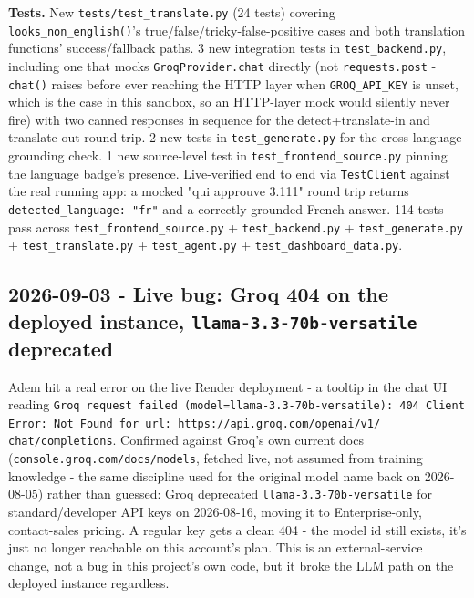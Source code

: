 \textbf{Tests.} New \texttt{tests/\allowbreak{}test\_\allowbreak{}translate.py} (24 tests) covering \texttt{looks\_\allowbreak{}non\_\allowbreak{}english()}'s true/false/tricky-false-positive cases and both translation functions' success/fallback paths. 3 new integration tests in \texttt{test\_\allowbreak{}backend.py}, including one that mocks \texttt{GroqProvider.chat} directly (not \texttt{requests.post} - \texttt{chat()} raises before ever reaching the HTTP layer when \texttt{GROQ\_\allowbreak{}API\_\allowbreak{}KEY} is unset, which is the case in this sandbox, so an HTTP-layer mock would silently never fire) with two canned responses in sequence for the detect+translate-in and translate-out round trip. 2 new tests in \texttt{test\_\allowbreak{}generate.py} for the cross-language grounding check. 1 new source-level test in \texttt{test\_\allowbreak{}frontend\_\allowbreak{}source.py} pinning the language badge's presence. Live-verified end to end via \texttt{TestClient} against the real running app: a mocked "qui approuve 3.111" round trip returns \texttt{detected\_\allowbreak{}language: "fr"} and a correctly-grounded French answer. 114 tests pass across \texttt{test\_\allowbreak{}frontend\_\allowbreak{}source.py} + \texttt{test\_\allowbreak{}backend.py} + \texttt{test\_\allowbreak{}generate.py} + \texttt{test\_\allowbreak{}translate.py} + \texttt{test\_\allowbreak{}agent.py} + \texttt{test\_\allowbreak{}dashboard\_\allowbreak{}data.py}.

\subsection*{2026-09-03 - Live bug: Groq 404 on the deployed instance, \texttt{llama-3.3-70b-versatile} deprecated}
Adem hit a real error on the live Render deployment - a tooltip in the chat UI reading \texttt{Groq request failed (model=llama-3.3-70b-versatile): 404 Client Error: Not Found for url: https:/\allowbreak{}/\allowbreak{}api.groq.com/\allowbreak{}openai/\allowbreak{}v1/\allowbreak{} chat/\allowbreak{}completions}. Confirmed against Groq's own current docs (\texttt{console.groq.com/\allowbreak{}docs/\allowbreak{}models}, fetched live, not assumed from training knowledge - the same discipline used for the original model name back on 2026-08-05) rather than guessed: Groq deprecated \texttt{llama-3.3-70b-versatile} for standard/developer API keys on 2026-08-16, moving it to Enterprise-only, contact-sales pricing. A regular key gets a clean 404 - the model id still exists, it's just no longer reachable on this account's plan. This is an external-service change, not a bug in this project's own code, but it broke the LLM path on the deployed instance regardless.

